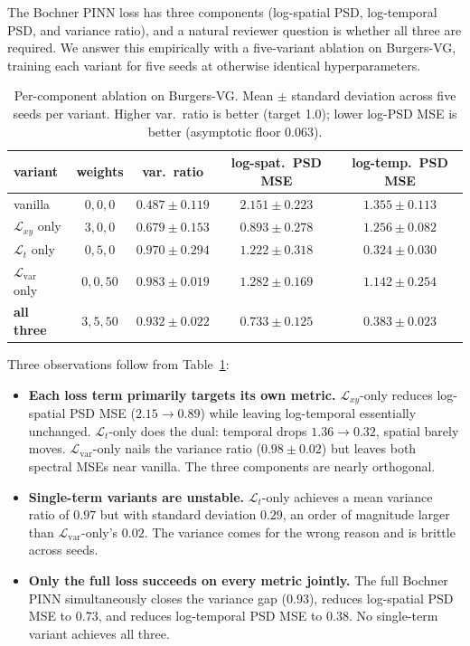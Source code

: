 \documentclass[review,12pt]{elsarticle}
\begin{document}
The Bochner PINN loss has three components (log-spatial PSD,
log-temporal PSD, and variance ratio), and a natural reviewer
question is whether all three are required. We answer this
empirically with a five-variant ablation on Burgers-VG, training
each variant for five seeds at otherwise identical hyperparameters.

\begin{table}[h]
\centering
\caption{Per-component ablation on Burgers-VG. Mean $\pm$ standard
deviation across five seeds per variant. Higher var.\ ratio is
better (target 1.0); lower log-PSD MSE is better (asymptotic
floor 0.063).}
\label{tab:ablation}
\begin{tabular}{l c c c c}
\toprule
variant & weights & var.\ ratio & log-spat.\ PSD MSE & log-temp.\ PSD MSE \\
\midrule
vanilla             & $0,0,0$  & $0.487 \pm 0.119$ & $2.151 \pm 0.223$ & $1.355 \pm 0.113$ \\
$\mathcal{L}_{xy}$ only     & $3,0,0$  & $0.679 \pm 0.153$ & $0.893 \pm 0.278$ & $1.256 \pm 0.082$ \\
$\mathcal{L}_{t}$ only     & $0,5,0$  & $0.970 \pm 0.294$ & $1.222 \pm 0.318$ & $0.324 \pm 0.030$ \\
$\mathcal{L}_{\mathrm{var}}$ only & $0,0,50$ & $0.983 \pm 0.019$ & $1.282 \pm 0.169$ & $1.142 \pm 0.254$ \\
\textbf{all three}        & $3,5,50$  & $0.932 \pm 0.022$ & $0.733 \pm 0.125$ & $0.383 \pm 0.023$ \\
\bottomrule
\end{tabular}
\end{table}

Three observations follow from Table~\ref{tab:ablation}:
\begin{itemize}
\item \textbf{Each loss term primarily targets its own metric.}
$\mathcal{L}_{xy}$-only reduces log-spatial PSD MSE
($2.15 \to 0.89$) while leaving log-temporal essentially unchanged.
$\mathcal{L}_{t}$-only does the dual: temporal drops
$1.36 \to 0.32$, spatial barely moves.
$\mathcal{L}_{\mathrm{var}}$-only nails the variance ratio
($0.98 \pm 0.02$) but leaves both spectral MSEs near vanilla.
The three components are nearly orthogonal.

\item \textbf{Single-term variants are unstable.}
$\mathcal{L}_{t}$-only achieves a mean variance ratio of $0.97$
but with standard deviation $0.29$, an order of magnitude larger
than $\mathcal{L}_{\mathrm{var}}$-only's $0.02$. The variance
comes for the wrong reason and is brittle across seeds.

\item \textbf{Only the full loss succeeds on every metric jointly.}
The full Bochner PINN simultaneously closes the variance gap
($0.93$), reduces log-spatial PSD MSE to $0.73$, and reduces
log-temporal PSD MSE to $0.38$. No single-term variant achieves
all three.
\end{itemize}
\end{document}
